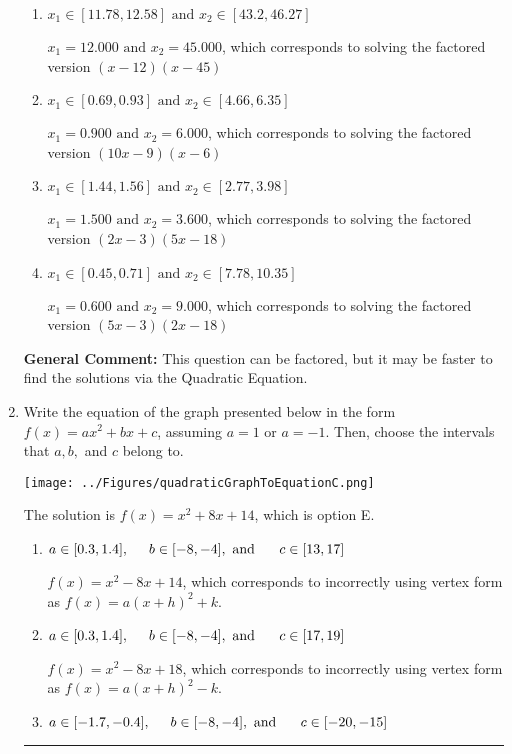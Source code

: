 \documentclass{extbook}[14pt]
\newcommand{\litem}[1]{\item #1

\rule{\textwidth}{0.4pt}}
\begin{document}
\begin{enumerate}
{\begin{enumerate}[label=\Alph*.]
* $x_1 = 1.200 \text{ and } x_2 = 4.500$, which is the correct option. Obtained by solving the factored version $(5x -6)(2x -9)$
\item \( x_1 \in [11.78, 12.58] \text{ and } x_2 \in [43.2, 46.27] \)

$x_1 = 12.000 \text{ and } x_2 = 45.000$, which corresponds to solving the factored version $(x -12)(x -45)$
\item \( x_1 \in [0.69, 0.93] \text{ and } x_2 \in [4.66, 6.35] \)

$x_1 = 0.900 \text{ and } x_2 = 6.000$, which corresponds to solving the factored version $(10x -9)(x -6)$
\item \( x_1 \in [1.44, 1.56] \text{ and } x_2 \in [2.77, 3.98] \)

$x_1 = 1.500 \text{ and } x_2 = 3.600$, which corresponds to solving the factored version $(2x -3)(5x -18)$
\item \( x_1 \in [0.45, 0.71] \text{ and } x_2 \in [7.78, 10.35] \)

$x_1 = 0.600 \text{ and } x_2 = 9.000$, which corresponds to solving the factored version $(5x -3)(2x -18)$
\end{enumerate}

\textbf{General Comment:} This question can be factored, but it may be faster to find the solutions via the Quadratic Equation.
}
\litem{
Write the equation of the graph presented below in the form $f(x)=ax^2+bx+c$, assuming  $a=1$ or $a=-1$. Then, choose the intervals that $a, b,$ and $c$ belong to.

\begin{center}
    \texttt{[image: ../Figures/quadraticGraphToEquationC.png]}
\end{center}


The solution is \( f(x) = x^{2} +8 x + 14 \), which is option E.\begin{enumerate}[label=\Alph*.]
\item \( a \in [0.3, 1.4], \hspace*{5mm} b \in [-8, -4], \text{ and } \hspace*{5mm} c \in [13, 17] \)

$f(x)=x^{2} -8 x + 14$, which corresponds to incorrectly using vertex form as $f(x) = a(x+h)^2+k$.
\item \( a \in [0.3, 1.4], \hspace*{5mm} b \in [-8, -4], \text{ and } \hspace*{5mm} c \in [17, 19] \)

$f(x)=x^{2} -8 x + 18$, which corresponds to incorrectly using vertex form as $f(x) = a(x+h)^2 - k$.
\item \( a \in [-1.7, -0.4], \hspace*{5mm} b \in [-8, -4], \text{ and } \hspace*{5mm} c \in [-20, -15] \)


\end{enumerate}}
\end{enumerate}
\end{document}
